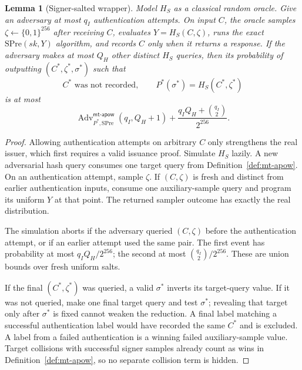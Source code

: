 \documentclass[11pt]{article}
\newcommand{\Adv}{\operatorname{Adv}}
\newtheorem{lemma}{Lemma}
\theoremstyle{remark}
\begin{document}
\begin{lemma}[Signer-salted wrapper]
\label{lem:salted}
Model $H_S$ as a classical random oracle. Give an adversary at most $q_I$
authentication attempts. On input $C$, the oracle samples
$\zeta\leftarrow{\{0,1\}}^{256}$ after receiving $C$, evaluates
$Y=H_S(C,\zeta)$, runs the exact $\mathrm{SPre}(sk,Y)$ algorithm, and records
$C$ only when it returns a response. If the adversary makes at most $Q_H$
other distinct $H_S$ queries, then its probability of outputting
$(C^*,\zeta^*,\sigma^*)$ such that
\[
 C^* \text{ was not recorded},\qquad
 P^*(\sigma^*)=H_S(C^*,\zeta^*)
\]
is at most
\begin{equation}
\label{eq:salted-bound}
 \Adv^{\mathsf{mt\text{-}apow}}_{P^*,\mathrm{SPre}}
      (q_I,Q_H+1)
 + \frac{q_I Q_H+\binom{q_I}{2}}{2^{256}}.
\end{equation}
\end{lemma}

\begin{proof}
Allowing authentication attempts on arbitrary $C$ only strengthens the real
issuer, which first requires a valid issuance proof.
Simulate $H_S$ lazily. A new adversarial hash query consumes one target query
from Definition~\ref{def:mt-apow}. On an authentication attempt, sample
$\zeta$. If $(C,\zeta)$ is fresh and distinct from earlier authentication
inputs, consume one auxiliary-sample query and program its uniform $Y$ at
that point. The returned sampler outcome has exactly the real distribution.

The simulation aborts if the adversary queried $(C,\zeta)$ before the
authentication attempt, or if an earlier attempt used the same pair. The
first event has probability at most $q_I Q_H/2^{256}$; the second at most
$\binom{q_I}{2}/2^{256}$. These are union bounds over fresh uniform salts.

If the final $(C^*,\zeta^*)$ was queried, a valid $\sigma^*$ inverts its
target-query value. If it was not queried, make one final target query and
test $\sigma^*$; revealing that target only after $\sigma^*$ is fixed cannot
weaken the reduction. A final label matching a successful authentication
label would have recorded the same $C^*$ and is excluded. A label from a
failed authentication is a winning failed auxiliary-sample value. Target
collisions with successful signer samples already count as wins in
Definition~\ref{def:mt-apow}, so no separate collision term is hidden.
\end{proof}
\end{document}
